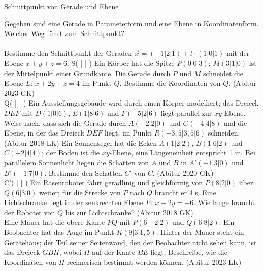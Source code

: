 \begin{aufgabe}{Schnittpunkt von Gerade und Ebene}
\begin{teile}
\teil Gegeben sind eine Gerade in Parameterform und eine Ebene in Koordinatenform. Welcher Weg führt zum Schnittpunkt? \\  \\ 
\teil Bestimme den Schnittpunkt der Geraden $\vec{x} = (-1|2|1) + t \cdot (1|0|1)$ mit der Ebene $x + y + z = 6$. S( \leerfeld | \leerfeld | \leerfeld )
\teil Ein Körper hat die Spitze $P(0|0|3)$; $M(3|1|0)$ ist der Mittelpunkt einer Grundkante. Die Gerade durch $P$ und $M$ schneidet die Ebene $L$: $x + 2y + z = 4$ im Punkt $Q$. Bestimme die Koordinaten von $Q$. \hfill (Abitur 2023 GK) \\ Q( \leerfeld | \leerfeld | \leerfeld )
\teil Ein Ausstellungsgebäude wird durch einen Körper modelliert; das Dreieck $DEF$ mit $D(1|0|6)$, $E(1|8|6)$ und $F(-5|2|6)$ liegt parallel zur $xy$-Ebene. Weise nach, dass sich die Gerade durch $A(-2|2|0)$ und $G(-4|4|8)$ und die Ebene, in der das Dreieck $DEF$ liegt, im Punkt $R(-3{,}5|3{,}5|6)$ schneiden. \hfill (Abitur 2018 LK)
\teil Ein Sonnensegel hat die Ecken $A(1|2|2)$, $B(1|6|2)$ und $C(-2|4|4)$; der Boden ist die $xy$-Ebene, eine Längeneinheit entspricht 1 m. Bei parallelem Sonnenlicht liegen die Schatten von $A$ und $B$ in $A'(-1|3|0)$ und $B'(-1|7|0)$. Bestimme den Schatten $C'$ von $C$. \hfill (Abitur 2020 GK) \\ C'( \leerfeld | \leerfeld | \leerfeld )
\teil Ein Rasenroboter fährt geradlinig und gleichförmig von $P(8|2|0)$ über $Q(6|3|0)$ weiter; für die Strecke von $P$ nach $Q$ braucht er 4 s. Eine Lichtschranke liegt in der senkrechten Ebene $E$: $x - 2y = -6$. Wie lange braucht der Roboter von $Q$ bis zur Lichtschranke? \hfill (Abitur 2018 GK) \\ \leerfeld[s]
\teil Eine Mauer hat die obere Kante $PQ$ mit $P(6|-2|2)$ und $Q(6|8|2)$. Ein Beobachter hat das Auge im Punkt $K(9|3|1{,}5)$. Hinter der Mauer steht ein Gerätehaus; der Teil seiner Seitenwand, den der Beobachter nicht sehen kann, ist das Dreieck $GBH$, wobei $H$ auf der Kante $BE$ liegt. Beschreibe, wie die Koordinaten von $H$ rechnerisch bestimmt werden können. \hfill (Abitur 2023 LK)
\end{teile}
\end{aufgabe}

